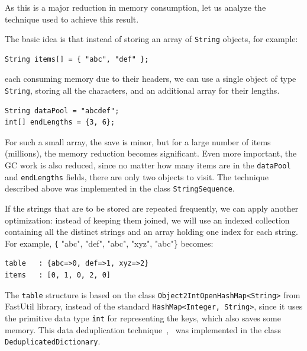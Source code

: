 \documentclass[a4paper,twoside]{article}
\begin{document}
As this is a major reduction in memory consumption, let us analyze the technique used to achieve this result.

The basic idea is that instead of storing an array of {\texttt{String}} objects, for example:
\begin{verbatim}
String items[] = { "abc", "def" };
\end{verbatim}
each consuming memory due to their headers, we can use 
a single object of type {\texttt{String}}, storing all the characters, and an additional array for their lengths.
\begin{verbatim}
String dataPool = "abcdef";
int[] endLengths = {3, 6};
\end{verbatim}

For such a small array, the save is minor, but for a large number of items (millions), the memory reduction becomes significant.
Even more important, the GC work is also reduced, since no matter how many items are in the {\texttt{dataPool}} and {\texttt{endLengths}} fields, there are only two objects to visit.
The technique described above was implemented in the class {\texttt{StringSequence}}.

If the strings that are to be stored are repeated frequently, we can apply another optimization:
instead of keeping them joined, we will use an indexed collection containing all the distinct strings and an array holding one index for each string.
For example, {\texttt{\{} "abc", "def", "abc", "xyz", "abc"\}} becomes:
\begin{verbatim}
table   : {abc=>0, def=>1, xyz=>2}
items   : [0, 1, 0, 2, 0]
\end{verbatim}
The {\texttt{table}} structure is based on the class {\texttt{Object2IntOpenHashMap<String>}} from FastUtil library, instead of the standard {\texttt{HashMap<Integer, String>}}, since it uses the primitive data type {\texttt{int}} for representing the keys, which also saves some memory.
This data deduplication technique~\cite{he:2010},~\cite{manogar:2014} was implemented in the class {\texttt{DeduplicatedDictionary}}.
\end{document}
